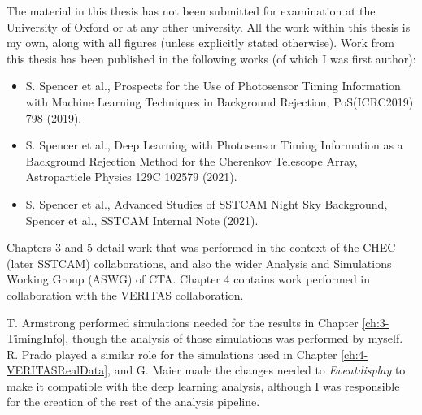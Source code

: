 The material in this thesis has not been submitted for examination at the University of Oxford or at any other university. All the work within this thesis is my own, along with all figures (unless explicitly stated otherwise). Work from this thesis has been published in the following works (of which I was first author):

\begin{centering}
\begin{itemize}
    \item S. Spencer et al., Prospects for the Use of Photosensor Timing Information with Machine Learning Techniques in Background Rejection, PoS(ICRC2019) 798 (2019).
    \item S. Spencer et al., Deep Learning with Photosensor Timing Information as a Background Rejection Method for the Cherenkov Telescope Array, Astroparticle Physics 129C 102579 (2021).
    \item S. Spencer et al., Advanced Studies of SSTCAM Night Sky Background, Spencer et al., SSTCAM Internal Note (2021). 
\end{itemize}
\end{centering}

Chapters 3 and 5 detail work that was performed in the context of the CHEC (later SSTCAM) collaborations, and also the wider Analysis and Simulations Working Group (ASWG) of CTA. Chapter 4 contains work performed in collaboration with the VERITAS collaboration.

T. Armstrong performed simulations needed for the results in Chapter \ref{ch:3-TimingInfo}, though the analysis of those simulations was performed by myself. R. Prado played a similar role for the simulations used in Chapter \ref{ch:4-VERITASRealData}, and G. Maier made the changes needed to \textit{Eventdisplay} to make it compatible with the deep learning analysis, although I was responsible for the creation of the rest of the analysis pipeline.